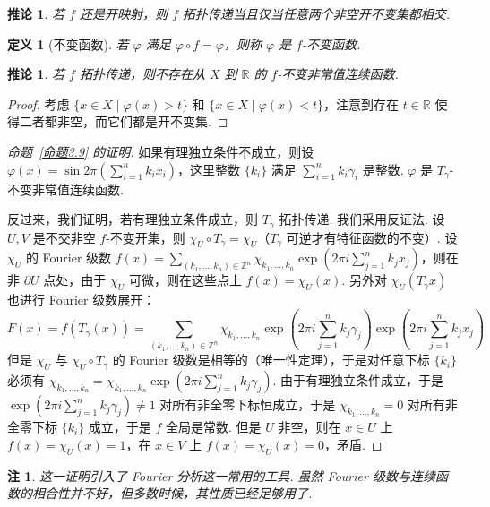 \documentclass[11pt, a4paper, oneside]{ctexart}
\newtheorem{corollary}[theorem]{推论}
\newtheorem{definition}[theorem]{定义}
\newtheorem{remark}[theorem]{注}
\newcommand{\R}{\mathbb{R}}
\newcommand{\Z}{\mathbb{Z}}
\begin{document}
    \begin{corollary}
        若 $f$ 还是开映射，则 $f$ 拓扑传递当且仅当任意两个非空开不变集都相交.
    \end{corollary}
    
    \begin{definition}[不变函数]
        若 $\varphi$ 满足 $\varphi\circ f=\varphi$，则称 $\varphi$ 是 $f$-不变函数.
    \end{definition}
    \begin{corollary}
        若 $f$ 拓扑传递，则不存在从 $X$ 到 $\R$ 的 $f$-不变非常值连续函数.
    \end{corollary}
    \begin{proof}
        考虑 $\{x\in X\mid \varphi(x)>t\}$ 和 $\{x\in X\mid \varphi(x)<t\}$，注意到存在 $t\in\R$ 使得二者都非空，而它们都是开不变集.
    \end{proof}

    \begin{proof}[命题~\ref{命题3.9} 的证明]
        如果有理独立条件不成立，则设 $\varphi(x)=\sin 2\pi(\sum\limits_{i=1}^{n}k_i x_i)$，这里整数 $\{k_i\}$ 满足 $\sum\limits_{i=1}^{n}k_i\gamma_i$ 是整数. $\varphi$ 是 $T_{\gamma}$-不变非常值连续函数.

        反过来，我们证明，若有理独立条件成立，则 $T_{\gamma}$ 拓扑传递. 我们采用反证法. 设 $U,V$ 是不交非空 $f$-不变开集，则 $\chi_U\circ T_{\gamma}=\chi_U$（$T_{\gamma}$ 可逆才有特征函数的不变）. 设 $\chi_U$ 的 Fourier 级数 $f(x)=\sum\limits_{(k_1,\ldots,k_n)\in\Z^n}\chi_{k_1,\ldots,k_n}\exp(2\pi i\sum\limits_{j=1}^{n}k_j x_j)$，则在非 $\partial U$ 点处，由于 $\chi_U$ 可微，则在这些点上 $f(x)=\chi_U(x)$. 另外对 $\chi_U(T_{\gamma}x)$ 也进行 Fourier 级数展开：
        \[
        F(x)=f(T_{\gamma}(x))=\sum\limits_{(k_1,\ldots,k_n)\in\Z^n}\chi_{k_1,\ldots,k_n}\exp(2\pi i\sum\limits_{j=1}^{n}k_j \gamma_j)\exp(2\pi i\sum\limits_{j=1}^{n}k_j x_j)
        \]
        但是 $\chi_U$ 与 $\chi_U\circ T_{\gamma}$ 的 Fourier 级数是相等的（唯一性定理），于是对任意下标 $\{k_i\}$ 必须有 $\chi_{k_1,\ldots,k_n}=\chi_{k_1,\ldots,k_n}\exp(2\pi i\sum\limits_{j=1}^{n}k_j \gamma_j)$. 由于有理独立条件成立，于是 $\exp(2\pi i\sum\limits_{j=1}^{n}k_j \gamma_j)\neq 1$ 对所有非全零下标恒成立，于是 $\chi_{k_1,\ldots,k_n}=0$ 对所有非全零下标 $\{k_i\}$ 成立，于是 $f$ 全局是常数. 但是 $U$ 非空，则在 $x\in U$ 上 $f(x)=\chi_U(x)=1$，在 $x\in V$ 上 $f(x)=\chi_U(x)=0$，矛盾.
    \end{proof}
    \begin{remark}
        这一证明引入了 Fourier 分析这一常用的工具. 虽然 Fourier 级数与连续函数的相合性并不好，但多数时候，其性质已经足够用了.
    \end{remark}
\end{document}
